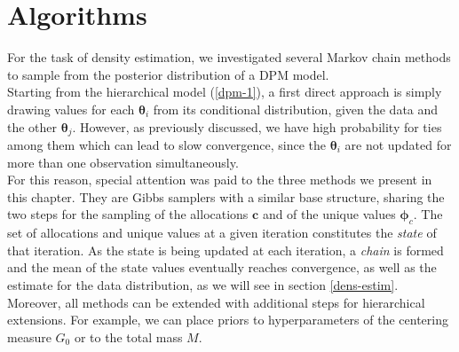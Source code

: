 \chapter{Algorithms} \label{algo}
For the task of density estimation, we investigated several Markov chain methods to sample from the posterior distribution of a DPM model. \\
Starting from the hierarchical model (\ref{dpm-1}), a first direct approach is simply drawing values for each $\boldsymbol\theta_i$ from its conditional distribution, given the data and the other $\boldsymbol\theta_j$.
However, as previously discussed, we have high probability for ties among them which can lead to slow convergence, since the $\boldsymbol\theta_i$ are not updated for more than one observation simultaneously. \\
For this reason, special attention was paid to the three methods we present in this chapter.
They are Gibbs samplers with a similar base structure, sharing the two steps for the sampling of the allocations $\mathbf{c}$ and of the unique values $\boldsymbol\phi_c$.
The set of allocations and unique values at a given iteration constitutes the \emph{state} of that iteration.
As the state is being updated at each iteration, a \emph{chain} is formed and the mean of the state values eventually reaches convergence, as well as the estimate for the data distribution, as we will see in section \ref{dens-estim}.
Moreover, all methods can be extended with additional steps for hierarchical extensions.
For example, we can place priors to hyperparameters of the centering measure $G_0$ or to the total mass $M$.

